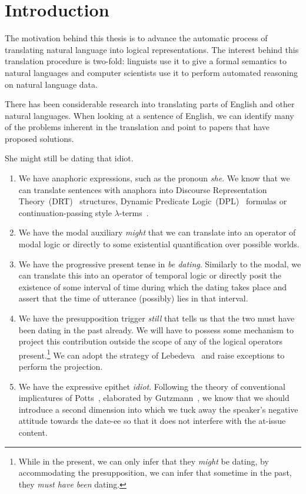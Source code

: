 \chapter*{Introduction}

The motivation behind this thesis is to advance the automatic process of
translating natural language into logical representations. The interest
behind this translation procedure is two-fold: linguists use it to give a
formal semantics to natural languages and computer scientists use it to
perform automated reasoning on natural language data.

There has been considerable research into translating parts of English and
other natural languages. When looking at a sentence of English, we can
identify many of the problems inherent in the translation and point to
papers that have proposed solutions.

\begin{exe}
  \ex She might still be dating that idiot. \label{ex:intro}
\end{exe}

\begin{enumerate}
\item \label{item:first-feature} We have anaphoric expressions, such as the
  pronoun \emph{she}. We know that we can translate sentences with anaphora
  into Discourse Representation Theory~(DRT)~\cite{kamp1993discourse}
  structures, Dynamic Predicate Logic~(DPL)~\cite{groenendijk1991dynamic}
  formulas or continuation-passing style
  $\lambda$-terms~\cite{de2006towards}.
  \item We have the modal auxiliary \emph{might} that we can translate into
    an operator of modal logic or directly to some existential
    quantification over possible worlds.
  \item We have the progressive present tense in \emph{be
      dating}. Similarly to the modal, we can translate this into an
    operator of temporal logic or directly posit the existence of some
    interval of time during which the dating takes place and assert that
    the time of utterance (possibly) lies in that interval.
  \item We have the presupposition trigger \emph{still} that tells us that
    the two must have been dating in the past already. We will have to
    possess some mechanism to project this contribution outside the scope
    of any of the logical operators present.\footnote{While in the present,
      we can only infer that they \emph{might} be dating, by accommodating
      the presupposition, we can infer that sometime in the past, they
      \emph{must have been} dating.} We can adopt the strategy of
    Lebedeva~\cite{lebedeva2012expression} and raise exceptions to perform
    the projection.
  \item \label{item:last-feature} We have the expressive epithet
    \emph{idiot}. Following the theory of conventional implicatures of
    Potts~\cite{potts2005logic}, elaborated by
    Gutzmann~\cite{gutzmann2015use}, we know that we should introduce a
    second dimension into which we tuck away the speaker's negative
    attitude towards the date-ee so that it does not interfere with the
    at-issue content.
\end{enumerate}

